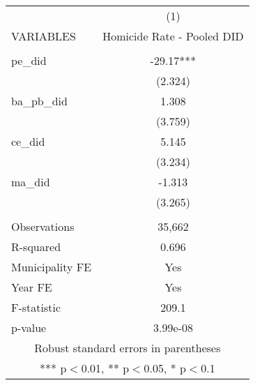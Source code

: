 \documentclass[]{article}
\begin{document}
\begin{tabular}{lc} \hline
 & (1) \\
VARIABLES & Homicide Rate - Pooled DID \\ \hline
 &  \\
pe\_did & -29.17*** \\
 & (2.324) \\
ba\_pb\_did & 1.308 \\
 & (3.759) \\
ce\_did & 5.145 \\
 & (3.234) \\
ma\_did & -1.313 \\
 & (3.265) \\
 &  \\
Observations & 35,662 \\
R-squared & 0.696 \\
Municipality FE & Yes \\
Year FE & Yes \\
F-statistic & 209.1 \\
 p-value & 3.99e-08 \\ \hline
\multicolumn{2}{c}{ Robust standard errors in parentheses} \\
\multicolumn{2}{c}{ *** p$<$0.01, ** p$<$0.05, * p$<$0.1} \\
\end{tabular}
\end{document}

